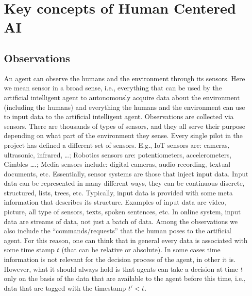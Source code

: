\section{Key concepts of Human Centered AI } 

\subsection{Observations}





An agent can observe the humans and the environment through its
sensors. Here we mean sensor in a broad sense, i.e., everything that
can be used by the artificial intelligent agent to autonomously
acquire data about the environment (including the humans) and
everything the humans and the environment can use to input data to the
artificial intelligent agent. 
%
%
Observations are collected via
sensors. There are thousands of types of sensors, and they all serve
their purpose depending on what part of the environment they
sense. Every single pilot in the project has defined a different set
of sensors. E.g., IoT sensors are: cameras, ultrasonic, infrared,
\dots; Robotics sensors are: potentiometers, accelerometers, Gimbles
\dots.; Media sensors include: digital cameras, audio recording,
textual documents, etc.  Essentially, sensor systems are those that
inject input data. Input data can be represented in many different
ways, they can be continuous discrete, structured, lists, trees,
etc. Typically, input data is provided with some meta information that
describes its structure.  Examples of input data are video, picture,
all type of sensors, texts, spoken sentences, etc. In online system,
input data are streams of data, not just a batch of data. Among the
observations we also include the ``commands/requests'' that the human
poses to the artificial agent.  For this reason, one can think that in
general every data is associated with some time stamp $t$ (that can be
relative or absolute). In some cases time information is not relevant
for the decision process of the agent, in other it is. However, what
it should always hold is that agents can take a decision at time $t$
only on the basis of the data that are available to the agent before
this time, i.e., data that are tagged with the timestamp $t'< t$.

